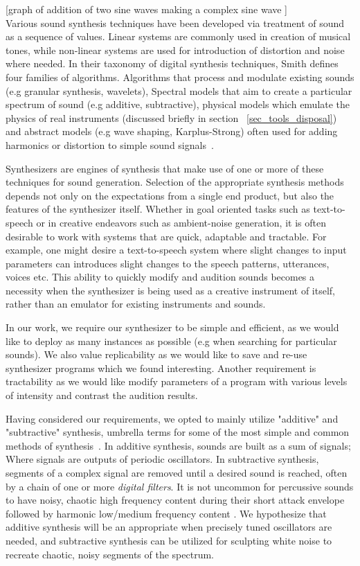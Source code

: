 \documentclass[\main/thesis.tex]{subfiles}
\begin{document}
[graph of addition of two sine waves making a complex sine wave ]
\\

Various sound synthesis techniques have been developed via treatment of sound as a sequence of values. Linear systems are commonly used in creation of musical tones, while non-linear systems are used for introduction of distortion and noise where needed. In their taxonomy of digital synthesis techniques, Smith defines four families of algorithms. Algorithms that process and modulate existing sounds (e.g granular synthesis, wavelets), Spectral models that aim to create a particular spectrum of sound (e.g additive, subtractive), physical models which emulate the physics of real instruments (discussed briefly in section ~\ref{sec_tools_disposal}) and abstract models (e.g wave shaping, Karplus-Strong) often used for adding harmonics or distortion to simple sound signals~\cite{smith1991viewpoints}. 

Synthesizers are engines of synthesis that make use of one or more of these techniques for sound generation. Selection of the appropriate synthesis methods depends not only on the expectations from a single end product, but also the features of the synthesizer itself. Whether in goal oriented tasks such as text-to-speech or in creative endeavors such as ambient-noise generation, it is often desirable to work with systems that are quick, adaptable and tractable. For example, one might desire a text-to-speech system where slight changes to input parameters can introduces slight changes to the speech patterns, utterances, voices etc. This ability to quickly modify and audition sounds becomes a necessity when the synthesizer is being used as a creative instrument of itself, rather than an emulator for existing instruments and sounds. 

In our work, we require our synthesizer to be simple and efficient, as we would like to deploy as many instances as possible (e.g when searching for particular sounds). We also value replicability as we would like to save and re-use synthesizer programs which we found interesting. Another requirement is tractability as we would like modify parameters of a program with various levels of intensity and contrast the audition results.

Having considered our requirements, we opted to mainly utilize "additive" and "subtractive" synthesis, umbrella terms for some of the most simple and common methods of synthesis~\cite{mitchell2009basicsynthChap1}. 
In additive synthesis, sounds are built as a sum of signals; Where signals are outputs of periodic oscillators.  In subtractive synthesis, segments of a complex signal are removed until a desired sound is reached, often by a chain of one or more \textit{digital filters}. It is not uncommon for percussive sounds to have noisy, chaotic high frequency content during their short attack envelope followed by harmonic low/medium frequency content \cite{lakatos2000common}. We hypothesize that additive synthesis will be an appropriate when precisely tuned oscillators are needed, and subtractive synthesis can be utilized for sculpting white noise to recreate chaotic, noisy segments of the spectrum.
\end{document}
